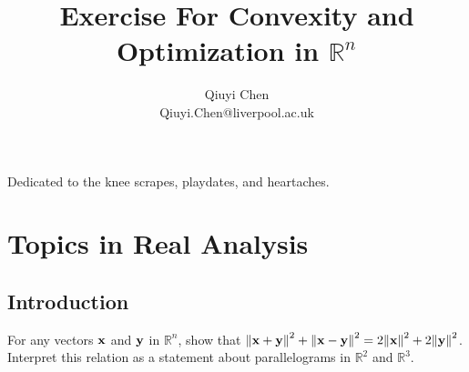\documentclass[10pt]{extarticle}
\title{\huge\bfseries Exercise For Convexity and Optimization in $\mathbb{R}^n$}
\author{\Large Qiuyi Chen\\
Qiuyi.Chen@liverpool.ac.uk}
\date{\calligra{May, 2025}}
\begin{document}
\setlength{\abovedisplayskip}{3pt}
\setlength{\belowdisplayskip}{3pt}
\setlength{\abovedisplayshortskip}{0pt}
\setlength{\belowdisplayshortskip}{0pt}
\maketitle

\begin{tcolorbox}[title=Contents, fonttitle=\huge\sffamily\bfseries\selectfont,interior style={left color=contcol1!40!white,right color=contcol2!40!white},frame style={left color=contcol1!80!white,right color=contcol2!80!white},coltitle=black,top=2mm,bottom=2mm,left=2mm,right=2mm,drop fuzzy shadow,enhanced,breakable]
    \makeatletter
    \makeatother
\end{tcolorbox}

\vspace*{10mm}

\clearpage
\vspace*{\fill}
\begin{center}
    Dedicated to the knee scrapes, playdates, and heartaches.
\end{center}

\vspace*{\fill}
\clearpage
\section{Topics in Real Analysis}
\subsection{Introduction}
\begin{exercise}[1.1]
    For any vectors $\bf{x}$ and $\bf{y}$ in $\mathbb{R}^n$, show that ${\Vert \bf{x} + \bf{y} \Vert}^2 +{\Vert \bf{x} - \bf{y} \Vert}^2 = 2{\Vert \bf{x} \Vert}^2 + 2{\Vert \bf{y} \Vert}^2$. Interpret this relation as a statement about parallelograms in $\mathbb{R}^2$ and $\mathbb{R}^3$.
\end{exercise}
\end{document}
